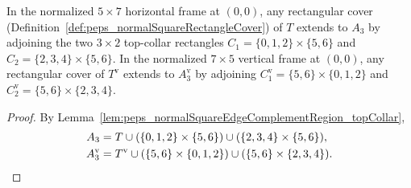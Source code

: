 \begin{lemma}%
    \label{lem:peps_normalSquareEdgeComplementRegion_coverOfT}
    \leanok
    In the normalized $5\times 7$ horizontal frame at $(0,0)$, any rectangular
    cover (Definition~\ref{def:peps_normalSquareRectangleCover}) of $T$ extends
    to $A_3$ by adjoining the two $3\times 2$ top-collar rectangles
    $C_1=\{0,1,2\}\times\{5,6\}$ and $C_2=\{2,3,4\}\times\{5,6\}$. In the
    normalized $7\times 5$ vertical frame at $(0,0)$, any rectangular cover of
    $T^{\mathrm v}$ extends to $A_3^{\mathrm v}$ by adjoining
    $C_1^{\mathrm v}=\{5,6\}\times\{0,1,2\}$ and
    $C_2^{\mathrm v}=\{5,6\}\times\{2,3,4\}$.
\end{lemma}
\begin{proof}\leanok
    By Lemma~\ref{lem:peps_normalSquareEdgeComplementRegion_topCollar},
    \begin{align}
        A_3
         & =T \cup (\{0,1,2\}\times\{5,6\})
        \cup (\{2,3,4\}\times\{5,6\}),
        \notag                                          \\
        A_3^{\mathrm v}
         & =T^{\mathrm v} \cup (\{5,6\}\times\{0,1,2\})
        \cup (\{5,6\}\times\{2,3,4\}).
        \notag
    \end{align}
\end{proof}

